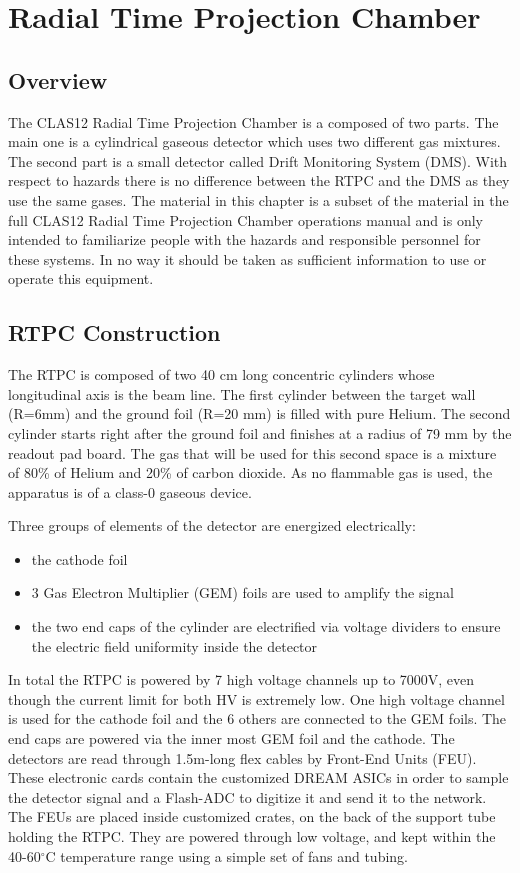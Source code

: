 \section{Radial Time Projection Chamber}

\subsection{Overview}
The CLAS12 Radial Time Projection Chamber is a composed of two parts. The main one is a cylindrical gaseous detector which uses two different gas mixtures. The second part is a small detector called Drift Monitoring System (DMS). With respect to hazards there is no difference between the RTPC and the DMS as they use the same gases.
The material in this chapter is a subset of the material in the full CLAS12 Radial Time Projection Chamber operations manual and is only intended to familiarize people with the hazards and responsible personnel for these systems. In no way it should be taken as sufficient information to use or operate this equipment.

\subsection{RTPC Construction}
The RTPC is composed of two 40 cm long concentric cylinders whose longitudinal axis is the beam line. The first cylinder between the target wall (R=6mm) and the ground foil (R=20 mm) is filled with pure Helium. The second cylinder starts right after the ground foil and finishes at a radius of 79 mm by the readout pad board. The gas that will be used for this second space is a mixture of 80\% of Helium and 20\% of carbon dioxide. As no flammable gas is used, the apparatus is of a class-0 gaseous device. 

Three groups of elements of the detector are energized electrically:
\begin{itemize}
\item the cathode foil
\item 3 Gas Electron Multiplier (GEM) foils are used to amplify the signal
\item the two end caps of the cylinder are electrified via voltage dividers to ensure the electric field uniformity inside the detector
\end{itemize}

In total the RTPC is powered by 7 high voltage channels up to 7000V, even though the current limit for both HV is extremely low. One high voltage channel is used for the cathode foil and the 6 others are connected to the GEM foils. The end caps are powered via the inner most GEM foil and the cathode. The detectors are read through 1.5m-long flex cables by Front-End Units (FEU). These electronic cards contain the customized DREAM ASICs in order to sample the detector signal and a Flash-ADC to digitize it and send it to the network. The FEUs are placed inside customized crates, on the back of the support tube holding the RTPC. They are powered through low voltage, and kept within the 40-60$^\circ$C temperature range using a simple set of fans and tubing.


